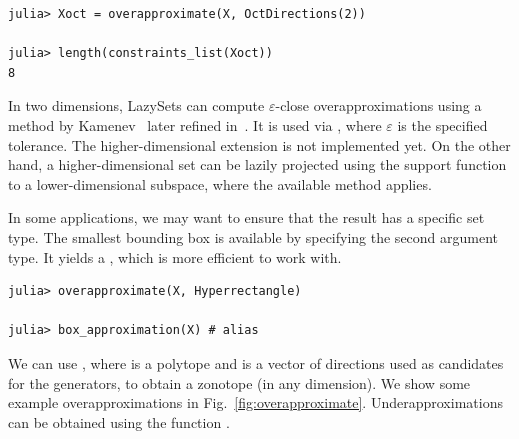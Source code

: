 \begin{minipage}{\linewidth}
\vspace{-\abovedisplayskip}
\begin{lstlisting}
julia> Xoct = overapproximate(X, OctDirections(2))

julia> length(constraints_list(Xoct))
8
\end{lstlisting}
\end{minipage}

In two dimensions, LazySets can compute $\varepsilon$-close overapproximations using a method by Kamenev~\cite{kamenev1996algorithm} later refined in~\cite{lotov2008modified}.
%
It is used via , where $\varepsilon$ is the specified tolerance.
%
The higher-dimensional extension is not implemented yet.
%
On the other hand, a higher-dimensional set can be lazily projected using the support function to a lower-dimensional subspace, where the available method applies.

\smallskip

In some applications, we may want to ensure that the result has a specific set type.
The smallest bounding box is available by specifying the second argument type. It yields a , which is more efficient to work with.

\begin{minipage}{\linewidth}
	\vspace{-\abovedisplayskip}
	\begin{lstlisting}
julia> overapproximate(X, Hyperrectangle)

julia> box_approximation(X) # alias
\end{lstlisting}
\end{minipage}

We can use , where  is a polytope and  is a vector of directions used as candidates for the generators, to obtain a zonotope (in any dimension). We show some example overapproximations in Fig.~\ref{fig:overapproximate}.
Underapproximations can be obtained using the function .
